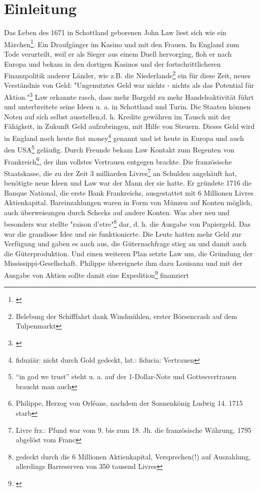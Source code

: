 \documentclass[
        onecolumn,
        a4paper,
        abstracton,
        parskip=half
        ,final
        ]{scrartcl}
\begin{document}
            \tableofcontents
            \listoffigures
            \listoftables

            \newpage
            \onehalfspacing


\section{Einleitung}
    \label{sec1:einleitung}

Das Leben des 1671 in Schottland geborenen John Law liest sich wie ein M{\"a}rchen\footnote[1]{\citep*[vgl.][Kap.2]{strathern2006schumpeters}}. Ein Draufg{\"a}nger im Kasino und mit den Frauen. In England zum Tode verurteilt, weil er als Sieger aus einem Duell hervorging, floh er nach Europa und bekam in den dortigen Kasinos und der fortschrittlicheren Finanzpolitik anderer L{\"a}nder, wie z.B. die Niederlande\footnote[2]{Belebung der Schifffahrt dank Windm{\"u}hlen, erster B{\"o}rsencrash auf dem Tulpenmarkt} ein f{\"u}r diese Zeit, neues Verst{\"a}ndnis von Geld: "Ungenutztes Geld war nichts - nichts als das Potential f{\"u}r Aktion."\footnote[3]{\citep*[vgl.][Kap.3]{strathern2006schumpeters}} Law erkannte rasch, dass mehr Bargeld zu mehr Handelsaktivit{\"a}t f{\"u}hrt und unterbreitete seine Ideen u. a. in Schottland und Turin. Die Staaten k{\"o}nnen Noten auf sich selbst ausstellen,d. h. Kredite gew{\"a}hren im Tausch mit der F{\"a}higkeit, in Zukunft Geld aufzubringen, mit Hilfe von Steuern. Dieses Geld wird in England noch heute fiat money\footnote[4]{fiduzi{\"a}r: nicht durch Gold gedeckt, lat.: fiducia: Vertrauen} genannt und ist heute in Europa und auch den USA\footnote[5]{"`in god we trust"' steht u. a. auf der 1-Dollar-Note und Gottesvertrauen braucht man auch} gel{\"a}ufig. Durch Freunde bekam Law Kontakt zum Regenten von Frankreich\footnote[6]{Philippe, Herzog von Orl\'{e}ans, nachdem der Sonnenk{\"o}nig Ludwig 14. 1715 starb}, der ihm vollstes Vertrauen entgegen brachte. Die franz{\"o}sische Staatskasse, die zu der Zeit 3 milliarden Livres\footnote[7]{Livre frz.: Pfund war vom 9. bis zum 18. Jh. die franz{\"o}sische W{\"a}hrung, 1795 abgel{\"o}st vom Franc} an Schulden angeh{\"a}uft hat, ben{\"o}tigte neue Ideen und Law war der Mann der sie hatte. Er gr{\"u}ndete 1716 die Banque National, die erste Bank Frankreichs, ausgestattet mit 6 Millionen Livres Aktienkapital. Bareinzahlungen waren in Form von M{\"u}nzen auf Konten m{\"o}glich, auch {\"u}berweisungen durch Schecks auf andere Konten. Was aber neu und besonders war stellte "raison d'etre"\footnote[8]{gedeckt durch die 6 Millionen Aktienkapital, Versprechen(!) auf Auszahlung, allerdings Barreserven von 350 tausend Livres} dar, d. h. die Ausgabe von Papiergeld. Das war die grandiose Idee und sie funktionierte. Die Leute hatten mehr Geld zur Verf{\"u}gung und gaben es auch aus, die G{\"u}ternachfrage stieg an und damit auch die G{\"u}terproduktion. Und einen weiteren Plan setzte Law um, die Gr{\"u}ndung der Mississippi-Gesellschaft. Philippe {\"u}bereignete ihm dazu Louisana und mit der Ausgabe von Aktien sollte damit eine Expedition\footnote[9]{\citep*[vgl.][Kap.3]{strathern2006schumpeters}} finanziert 
\end{document}
